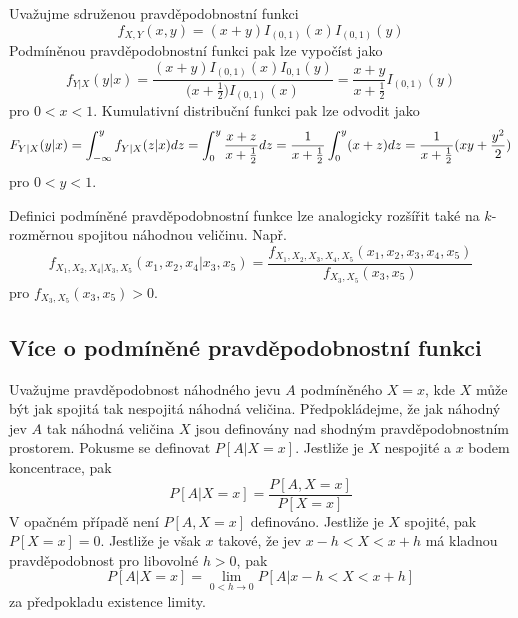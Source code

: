 \begin{example}
Uvažujme sdruženou pravděpodobnostní funkci
\begin{equation*}
f_{X,Y}(x,y) = (x + y)I_{(0,1)}(x)I_{(0,1)}(y)
\end{equation*}
Podmíněnou pravděpodobnostní funkci pak lze vypočíst jako
\begin{equation*}
f_{Y|X}(y|x) = \frac{(x + y)I_{(0, 1)}(x)I_{0, 1}(y)}{\Big(x + \frac{1}{2} \Big)I_{(0, 1)}(x)} = \frac{x + y}{x + \frac{1}{2}} I_{(0, 1)}(y)
\end{equation*}
pro $0 < x < 1$. Kumulativní distribuční funkci pak lze odvodit jako
\begin{equation*}
F_{Y|X}(y|x) = \int_{-\infty}^y f_{Y|X}(z|x)dz = \int_0^y \frac{x + z}{x + \frac{1}{2}}dz\\
= \frac{1}{x + \frac{1}{2}} \int_0^y (x + z) dz = \frac{1}{x + \frac{1}{2}}(xy + \frac{y^2}{2})
\end{equation*}
pro $0 < y < 1$.
\end{example}

Definici podmíněné pravděpodobnostní funkce lze analogicky rozšířit také na $k$-rozměrnou spojitou náhodnou veličinu. Např.
\begin{equation*}
f_{X_1, X_2, X_4 | X_3, X_5}(x_1, x_2, x_4 | x_3, x_5) = \frac{f_{X_1, X_2, X_3, X_4, X_5}(x_1, x_2, x_3, x_4, x_5)}{f_{X_3, X_5}(x_3, x_5)}
\end{equation*}
pro $f_{X_3, X_5}(x_3, x_5) > 0$.

\subsection{Více o podmíněné pravděpodobnostní funkci}

Uvažujme pravděpodobnost náhodného jevu $A$ podmíněného $X = x$, kde $X$ může být jak spojitá tak nespojitá náhodná veličina. Předpokládejme, že jak náhodný jev $A$ tak náhodná veličina $X$ jsou definovány nad shodným pravděpodobnostním prostorem. Pokusme se definovat $P[A|X = x]$. Jestliže je $X$ nespojité a $x$ bodem koncentrace, pak
\begin{equation*}
P[A|X = x] = \frac{P[A, X = x]}{P[X = x]}
\end{equation*}
V opačném případě není $P[A, X = x]$ definováno. Jestliže je $X$ spojité, pak $P[X = x] = 0$. Jestliže je však $x$ takové, že jev $x - h < X < x + h$ má kladnou pravděpodobnost pro libovolné $h > 0$, pak
\begin{equation*}
P[A | X = x] = \lim_{0 < h \rightarrow 0} P[A | x-h < X < x + h]
\end{equation*}
za předpokladu existence limity.\

